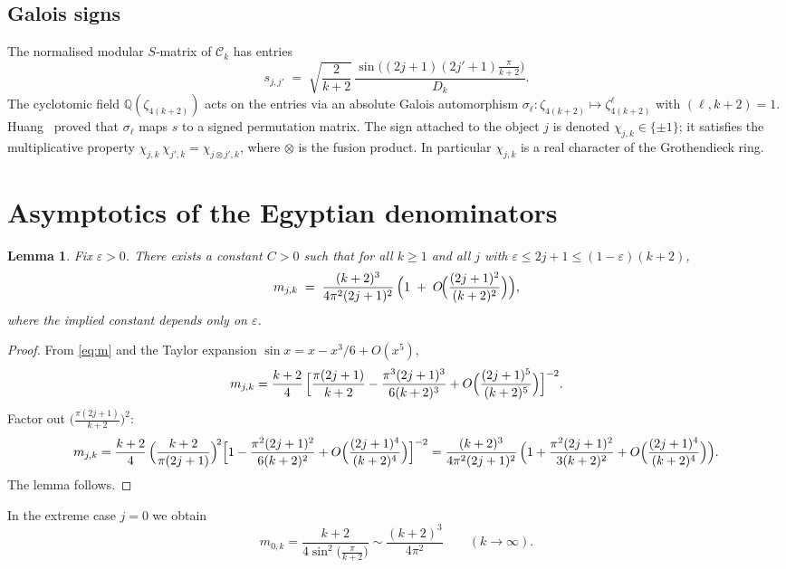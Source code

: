 \documentclass[11pt,a4paper]{article}
\newtheorem{lemma}[theorem]{Lemma}
\theoremstyle{definition}
\theoremstyle{remark}
\begin{document}
\subsection{Galois signs}
The normalised modular $S$‑matrix of $\mathcal{C}_k$ has entries
\[
s_{j,j'} \;=\; \sqrt{\frac{2}{k+2}}\,
            \frac{\sin\bigl((2j+1)(2j'+1)\frac{\pi}{k+2}\bigr)}{D_k}.
\]
The cyclotomic field $\mathbb Q(\zeta_{4(k+2)})$ acts on the entries via an absolute Galois automorphism
$\sigma_\ell:\zeta_{4(k+2)}\mapsto\zeta_{4(k+2)}^\ell$ with $(\ell,k+2)=1$.
Huang~\cite{huang} proved that $\sigma_\ell$ maps $s$ to a signed permutation matrix.
The sign attached to the object $j$ is denoted $\chi_{j,k}\in\{\pm1\}$;
it satisfies the multiplicative property $\chi_{j,k}\,\chi_{j',k}= \chi_{j\otimes j',k}$,
where $\otimes$ is the fusion product.
In particular $\chi_{j,k}$ is a real character of the Grothendieck ring.

\section{Asymptotics of the Egyptian denominators}

\begin{lemma}\label{lem:m-asymp}
Fix $\varepsilon>0$.  There exists a constant $C>0$ such that for all $k\ge1$ and all $j$ with
$\varepsilon\le 2j+1\le (1-\varepsilon)(k+2)$,
\[
m_{j,k} \;=\; \frac{(k+2)^3}{4\pi^2(2j+1)^2}\,
            \Bigl(1 \;+\; O\!\Bigl(\frac{(2j+1)^2}{(k+2)^2}\Bigr)\Bigr),
\]
where the implied constant depends only on $\varepsilon$.
\end{lemma}

\begin{proof}
From \eqref{eq:m} and the Taylor expansion $\sin x = x - x^3/6 + O(x^5)$,
\[
m_{j,k}
= \frac{k+2}{4}\,
  \Bigl[ \frac{\pi(2j+1)}{k+2} - \frac{\pi^3(2j+1)^3}{6(k+2)^3} + O\Bigl(\frac{(2j+1)^5}{(k+2)^5}\Bigr) \Bigr]^{-2}.
\]
Factor out $\bigl(\frac{\pi(2j+1)}{k+2}\bigr)^2$:
\[
m_{j,k}
= \frac{k+2}{4}\,
  \Bigl(\frac{k+2}{\pi(2j+1)}\Bigr)^{\!2}
  \Bigl[1 - \frac{\pi^2(2j+1)^2}{6(k+2)^2} + O\Bigl(\frac{(2j+1)^4}{(k+2)^4}\Bigr) \Bigr]^{-2}
= \frac{(k+2)^3}{4\pi^2(2j+1)^2}\,
  \Bigl(1 + \frac{\pi^2(2j+1)^2}{3(k+2)^2} + O\Bigl(\frac{(2j+1)^4}{(k+2)^4}\Bigr)\Bigr).
\]
The lemma follows.
\end{proof}

In the extreme case $j=0$ we obtain
\[
m_{0,k} = \frac{k+2}{4\sin^2\!\bigl(\frac{\pi}{k+2}\bigr)}
        \sim \frac{(k+2)^3}{4\pi^2} \qquad (k\to\infty).
\]
\end{document}
